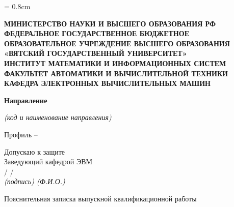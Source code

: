 \begin{titlepage}
	\newpage
	\singlespacing
	\topskip = 0.8cm
	\large

	\begin{center}
		\large
		\bfseries
		МИНИСТЕРСТВО НАУКИ И ВЫСШЕГО ОБРАЗОВАНИЯ РФ \\
		ФЕДЕРАЛЬНОЕ ГОСУДАРСТВЕННОЕ БЮДЖЕТНОЕ \\
		ОБРАЗОВАТЕЛЬНОЕ УЧРЕЖДЕНИЕ ВЫСШЕГО ОБРАЗОВАНИЯ \\
		«ВЯТСКИЙ ГОСУДАРСТВЕННЫЙ УНИВЕРСИТЕТ» \\
		ИНСТИТУТ МАТЕМАТИКИ И ИНФОРМАЦИОННЫХ СИСТЕМ \\
		ФАКУЛЬТЕТ АВТОМАТИКИ И ВЫЧИСЛИТЕЛЬНОЙ ТЕХНИКИ \\
		КАФЕДРА ЭЛЕКТРОННЫХ ВЫЧИСЛИТЕЛЬНЫХ МАШИН
	\end{center}

	\vspace{0.8cm}
	\begin{center}
		\textbf{Направление}
		\uline{\specialization}

		\small
		\textit{(код и наименование направления)}

		\large
		Профиль – \uline{\profile}
	\end{center}

	\vspace{0.8cm}
	\begin{flushright}
		Допускаю к защите \\
		Заведующий кафедрой ЭВМ \\
		\vspace{1mm}
		\uline{\hspace{3cm}} / \uline{\headofdepartment} / \\
		\vspace{1mm}
		\small
		\itshape
		(подпись) \hspace{1.8cm} (Ф.И.О.) \hspace{1.4cm}

	\end{flushright}

	\vspace{1.5cm}
	\begin{center}
		\huge
		\bfseries
		\topic
	\end{center}

	\begin{center}
		Пояснительная записка выпускной квалификационной работы \\
		\tpga
	\end{center}


\end{titlepage}
